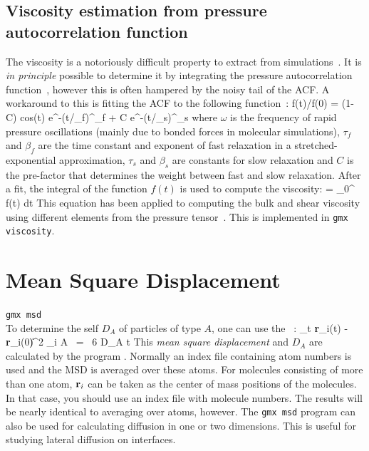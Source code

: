 \subsection{Viscosity estimation from pressure autocorrelation
  function}
The viscosity is a notoriously difficult property to extract from
simulations~\cite{Hess2002a,Wensink2003a}. It is {\em in principle}
possible to determine it by integrating the pressure autocorrelation
function~\cite{PSmith93c}, however this is often hampered by the noisy
tail of the ACF. A workaround to this is fitting the ACF to the
following function~\cite{Guo2002b}:
\beq
f(t)/f(0) = (1-C) {\rm cos}(\omega t) e^{-(t/\tau_f)^{\beta_f}} + C
e^{-(t/\tau_s)^{\beta_s}}
\eeq
where $\omega$ is the frequency of rapid pressure oscillations (mainly
due to bonded forces in molecular simulations), $\tau_f$ and $\beta_f$
are the time constant and exponent of fast relaxation in a
stretched-exponential approximation, $\tau_s$ and $\beta_s$ are constants
for slow relaxation and $C$ is the pre-factor that determines the
weight between fast and slow relaxation. After a fit, the integral of
the function $f(t)$ is used to compute the viscosity:
\beq
\eta = \int_0^{\infty} f(t) dt
\eeq
This equation has been
applied to computing the bulk and shear viscosity using different
elements from the pressure tensor~\cite{Fanourgakis2012a}.
This is implemented in {\tt gmx viscosity}.

\section{Mean Square Displacement}
\label{sec:msd}
{\tt gmx msd}\\
To determine the self  $D_A$ of
particles of type $A$, one can use the ~\cite{Allen87}:
\beq 
\lim_{t \rightarrow \infty} \langle
\|{\bf r}_i(t) - {\bf r}_i(0)\|^2 \rangle_{i \in A} ~=~ 6 D_A t 
\eeq
This {\em mean square displacement} and $D_A$ are calculated by the
program {\tt {}}. Normally an index file containing
atom numbers is used and the MSD is averaged over these atoms.  For
molecules consisting of more than one atom, ${\bf r}_i$ can be taken
as the center of mass positions of the molecules. In that case, you
should use an index file with molecule numbers. The results will be
nearly identical to averaging over atoms, however. The {\tt gmx msd}
program can
also be used for calculating diffusion in one or two dimensions. This
is useful for studying lateral diffusion on interfaces.

